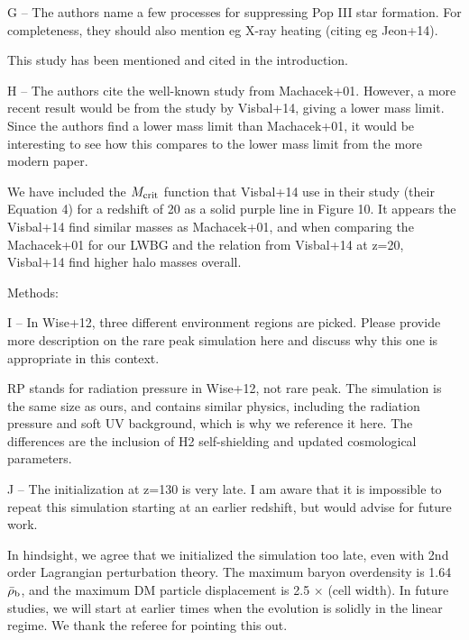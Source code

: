 \documentclass[11pt]{article}
\newenvironment{referee}[1][]{%
    \ignorespaces%
    \begin{mdframed}[style=myquotestyle,#1]%
}{%
    \end{mdframed}%
    \ignorespacesafterend%
}%
\begin{document}
\begin{referee}
G -- The authors name a few processes for suppressing Pop III star formation. For completeness, they should also mention eg X-ray heating (citing eg Jeon+14).
\end{referee}
This study has been mentioned and cited in the introduction.

\begin{referee}
H -- The authors cite the well-known study from Machacek+01. However, a more recent result would be from the study by Visbal+14, giving a lower mass limit. Since the authors find a lower mass limit than Machacek+01, it would be interesting to see how this compares to the lower mass limit from the more modern paper.
\end{referee}
We have included the $M_{\rm crit}$ function that Visbal+14 use in their study (their Equation 4) for a redshift of 20 as a solid purple line in Figure 10. It appears the Visbal+14 find similar masses as Machacek+01, and when comparing the Machacek+01 for our LWBG and the relation from Visbal+14 at z=20, Visbal+14 find higher halo masses overall.

\begin{referee}
Methods:

I -- In Wise+12, three different environment regions are picked. Please provide more description on the rare peak simulation here and discuss why this one is appropriate in this context.
\end{referee}
RP stands for radiation pressure in Wise+12, not rare peak. The simulation is the same size as ours, and contains similar physics, including the radiation pressure and soft UV background, which is why we reference it here. The differences are the inclusion of H2 self-shielding and updated cosmological parameters.
 
\begin{referee}
J -- The initialization at z=130 is very late. I am aware that it is impossible to repeat this simulation starting at an earlier redshift, but would advise for future work.
\end{referee}

In hindsight, we agree that we initialized the simulation too late, even with 2nd order Lagrangian perturbation theory.  The maximum baryon overdensity is 1.64$\bar{\rho}_{\rm b}$, and the maximum DM particle displacement is 2.5 $\times$ (cell width).  In future studies, we will start at earlier times when the evolution is solidly in the linear regime.  We thank the referee for pointing this out.
\end{document}
